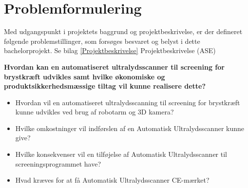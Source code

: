 \section{Problemformulering}
Med udgangspunkt i projektets baggrund og projektbeskrivelse, er der defineret følgende problemstillinger, som forsøges besvaret og belyst i dette bachelorprojekt. Se bilag \ref{Projektbeskrivelse} Projektbeskrivelse (ASE)

\textbf{Hvordan kan en automatiseret ultralydsscanner til screening for brystkræft udvikles samt hvilke økonomiske og produktsikkerhedsmæssige tiltag vil kunne realisere dette?}

\let\labelitemi\labelitemii
\begin{itemize}
\item Hvordan vil en automatiseret ultralydsscanning til screening for brystkræft kunne udvikles ved brug af robotarm og 3D kamera?
\item Hvilke omkostninger vil indførslen af en Automatisk Ultralydsscanner kunne give? 
\item Hvilke konsekvenser vil en tilføjelse af Automatisk Ultralydsscanner til screeningsprogrammet have?
\item Hvad kræves for at få Automatisk Ultralydsscanner CE-mærket? 
\end{itemize}
